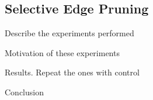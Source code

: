 \subsection{Selective Edge Pruning} \label{N_I:s_exp_edge_pruning}


\begin{todolist}
  \item Describe the experiments performed
  \item Motivation of these experiments
  \item Results. Repeat the ones with control
  \item Conclusion
\end{todolist}
